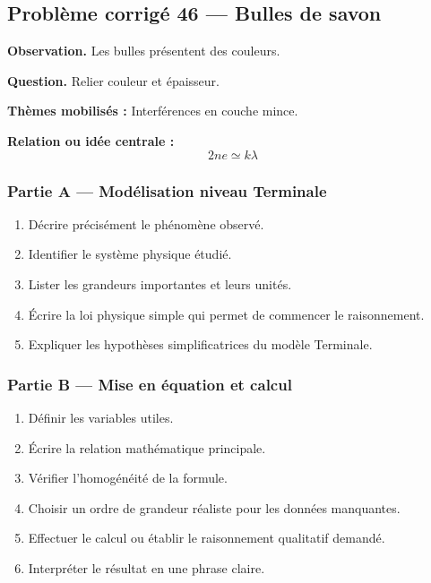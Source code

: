 \documentclass[11pt,a4paper]{article}
\begin{document}
\subsection{Problème corrigé 46 — Bulles de savon}

\begin{exercicebox}
\textbf{Observation.} Les bulles présentent des couleurs.

\medskip
\textbf{Question.} Relier couleur et épaisseur.

\medskip
\textbf{Thèmes mobilisés :} Interférences en couche mince.

\medskip
\textbf{Relation ou idée centrale :}
\[
2ne\simeq k\lambda
\]
\end{exercicebox}

\subsubsection*{Partie A — Modélisation niveau Terminale}

\begin{enumerate}
  \item Décrire précisément le phénomène observé.
  \item Identifier le système physique étudié.
  \item Lister les grandeurs importantes et leurs unités.
  \item Écrire la loi physique simple qui permet de commencer le raisonnement.
  \item Expliquer les hypothèses simplificatrices du modèle Terminale.
\end{enumerate}

\subsubsection*{Partie B — Mise en équation et calcul}

\begin{enumerate}
  \item Définir les variables utiles.
  \item Écrire la relation mathématique principale.
  \item Vérifier l'homogénéité de la formule.
  \item Choisir un ordre de grandeur réaliste pour les données manquantes.
  \item Effectuer le calcul ou établir le raisonnement qualitatif demandé.
  \item Interpréter le résultat en une phrase claire.
\end{enumerate}
\end{document}
